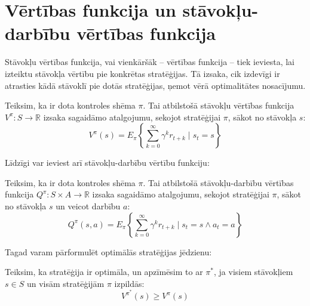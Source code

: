 \documentclass{ludis} %
\begin{document}

\section{Vērtības funkcija un stāvokļu-darbību vērtības funkcija}
Stāvokļu vērtības funkcija, vai vienkāršāk -- vērtības funkcija -- tiek ieviesta, lai izteiktu stāvokļa vērtību pie konkrētas stratēģijas.
Tā izsaka, cik izdevīgi ir atrasties kādā stāvoklī pie dotās stratēģijas, ņemot vērā optimalitātes nosacījumu.
\begin{definicija}
Teiksim, ka ir dota kontroles shēma $\pi$.
Tai atbilstošā stāvokļu vērtības funkcija $V^\pi : S \rightarrow \mathbb{R}$ izsaka sagaidāmo atalgojumu, sekojot stratēģijai $\pi$, sākot no stāvokļa $s$:
\[
	V^\pi (s) = E_\pi \left\{ \sum_{k=0}^{\infty} \gamma^k r_{t+k} \mid s_t = s\right\}
\]
\end{definicija}

Līdzīgi var ieviest arī stāvokļu-darbību vērtību funkciju:
\begin{definicija}
Teiksim, ka ir dota kontroles shēma $\pi$.
Tai atbilstošā stāvokļu-darbību vērtības funkcija $Q^\pi : S \times A \rightarrow \mathbb{R}$ izsaka sagaidāmo atalgojumu, sekojot stratēģijai $\pi$, sākot no stāvokļa $s$ un veicot darbību $a$:
\[
	Q^\pi (s,a) = E_\pi \left\{ \sum_{k=0}^{\infty} \gamma^k r_{t+k} \mid s_t = s \land a_t = a\right\}
\]
\end{definicija}

Tagad varam pārformulēt optimālās stratēģijas jēdzienu:
\begin{definicija}
Teiksim, ka stratēģija ir optimāla, un apzīmēsim to ar $\pi^*$, ja visiem stāvokļiem $s \in S$ un visām stratēģijām $\pi$ izpildās:
\[
	V^{\pi^*}(s) \geq V^{\pi}(s)
\]
\end{definicija}
\end{document}
